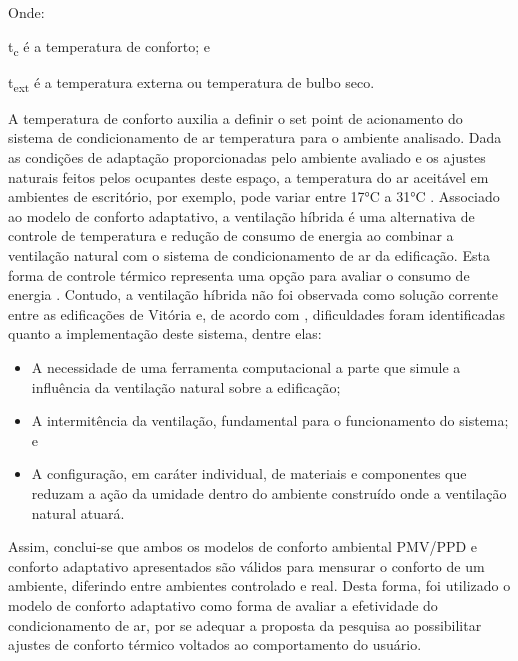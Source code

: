 Onde:\par
\setlength\parindent{1.5cm} t\textsubscript{c} é a temperatura de conforto; e\par
\setlength\parindent{1.5cm} t\textsubscript{ext} é a temperatura externa ou temperatura de bulbo seco.\par
\noindent A temperatura de conforto auxilia a definir o set point de acionamento do sistema de 
condicionamento de ar temperatura para o ambiente analisado. Dada as condições de 
adaptação proporcionadas pelo ambiente avaliado e os ajustes naturais feitos pelos 
ocupantes deste espaço, a temperatura do ar aceitável em ambientes de escritório, por 
exemplo, pode variar entre 17°C a 31°C \cite{AmericanSocietyofHeatingRefrigeratingandAir-ConditioningEngineers-ASHRAE2017a}.\vspace*{0.3cm} \newline
Associado ao modelo de conforto adaptativo, a ventilação híbrida é uma alternativa de 
controle de temperatura e redução de consumo de energia ao combinar a ventilação natural 
com o sistema de condicionamento de ar da edificação. Esta forma de controle térmico 
representa uma opção para avaliar o consumo de energia \cite{AmericanSocietyofHeatingRefrigeratingandAir-ConditioningEngineers-ASHRAE2017}.\vspace*{0.3cm} \newline
Contudo, a ventilação híbrida não foi observada como solução corrente entre as 
edificações de Vitória e, de acordo com \textcite{Shaviv2001,Zhang2014,Navarro2016,SCHULZE2018,Sudhakar2019}, 
dificuldades foram identificadas quanto a implementação deste sistema, dentre elas:
\begin{itemize}
    \item A necessidade de uma ferramenta computacional a parte que simule a influência 
    da ventilação natural sobre a edificação;
    \item A intermitência da ventilação, fundamental para o funcionamento do sistema; e
    \item A configuração, em caráter individual, de materiais e componentes que reduzam 
    a ação da umidade dentro do ambiente construído onde a ventilação natural atuará.
\end{itemize}
Assim, conclui-se que ambos os modelos de conforto ambiental PMV/PPD e conforto adaptativo 
apresentados são válidos para mensurar o conforto de um ambiente, diferindo entre ambientes 
controlado e real. Desta forma, foi utilizado o modelo de conforto adaptativo como forma 
de avaliar a efetividade do condicionamento de ar, por se adequar a proposta da pesquisa ao 
possibilitar ajustes de conforto térmico voltados ao comportamento do usuário.